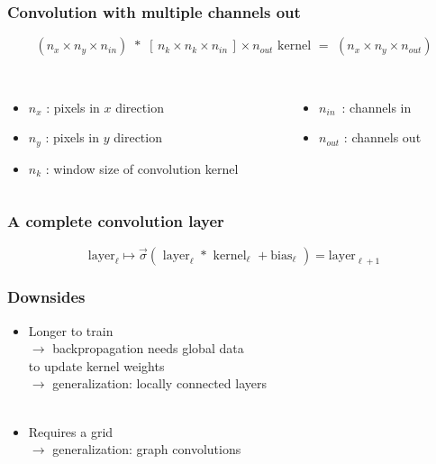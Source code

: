 \documentclass[aspectratio=169,14pt]{beamer}
\begin{document}
\begin{frame}
    \frametitle{Convolution with multiple channels out}
    {\normalsize $$ (n_x \times n_y \times n_{in}) \,\, * \,\,  [\, n_k \times n_k \times n_{in} \, ]\times n_{out} \text{ kernel} \,\, = \,\, (n_x \times n_y \times n_{out}) $$ }
    ~\\
    \begin{columns}[t]
        \begin{column}{0.5\textwidth}
            \begin{itemize}
                \item $n_x$ : pixels in $x$ direction
                \item $n_y$ : pixels in $y$ direction
                \item $n_k$ : window size of convolution kernel
            \end{itemize}
        \end{column}
        \begin{column}{0.5\textwidth}
            \begin{itemize}
                \item $n_{in}$ \,: channels in
                \item $n_{out}$ : channels out
            \end{itemize}
        \end{column}
    \end{columns}

\end{frame}


\begin{frame}
    \frametitle{A complete convolution layer}
$$ \text{layer}_\ell \longmapsto \vec{\sigma} \left(\,\, \text{layer}_{\ell} \,\,*\,\, \text{kernel}_{\ell} \,\,+ \text{bias}_\ell \,\,\right) = \text{layer}_{\ell+1}$$
\end{frame}


\begin{frame}
    \frametitle{Downsides}
\begin{itemize}
    \item Longer to train \\\qquad $\rightarrow$ backpropagation needs global data \\\qquad {\color{white}$\rightarrow$} to update kernel weights \\ \qquad $\rightarrow$ generalization: locally connected layers ~\\~\\
    \item Requires a grid \\\qquad $\rightarrow$ generalization: graph convolutions
\end{itemize}
\end{frame}
\end{document}
